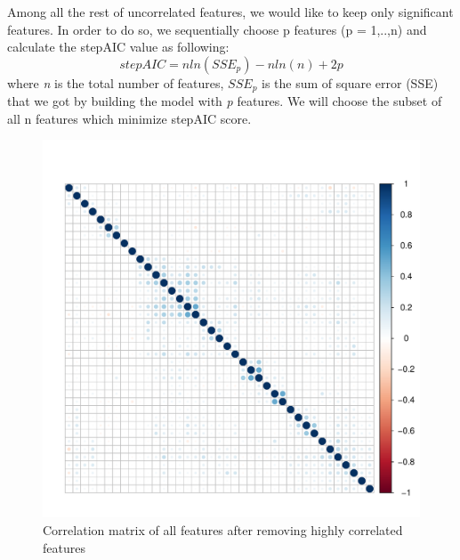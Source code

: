 Among all the rest of uncorrelated features, we would like to keep only significant features. In order to do so, we sequentially choose p features (p = 1,..,n) and calculate the stepAIC value as following:
\[
	stepAIC = nln(SSE_p) - nln(n) + 2p
\]
where \emph{n} is the total number of features, $SSE_p$ is the sum of square error (SSE) that we got by building the model with \emph{p} features. We will choose the subset of all n features which minimize stepAIC score.

\begin{figure}%
	\centering
	\includegraphics[width=\linewidth]{figs/CorrelationMatrix.pdf}
	\caption{Correlation matrix of all features after removing highly correlated features}
	\label{fig:CorrelationMatrix}
	\vspace{-10pt}
\end{figure}

